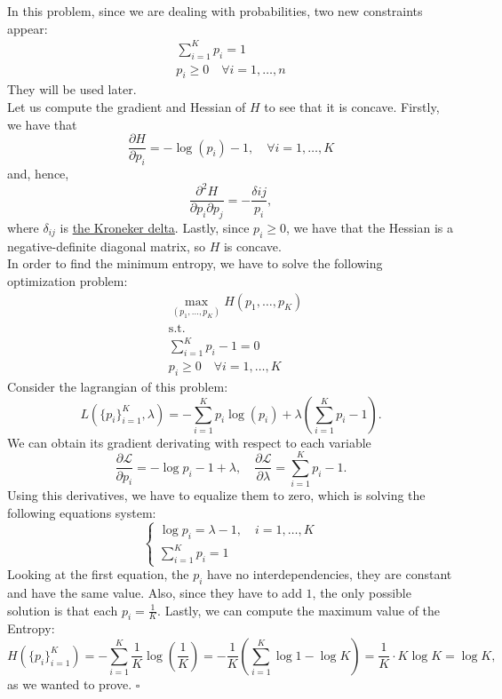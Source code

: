 \documentclass[11pt,table]{article}
\newcommand{\qed}{\hfill $\square$}
\begin{document}
In this problem, since we are dealing with probabilities, two new constraints appear:
\begin{align*}
	\sum_{i=1}^K p_i = 1 \\
	p_i \geq 0 \quad \forall i =1,\dots,n
\end{align*}
They will be used later.\\

Let us compute the gradient and Hessian of \(H\) to see that it is concave. Firstly, we have that
\[
	\frac{\partial H}{\partial p_i} = - \log(p_i) - 1, \quad \forall i = 1,\dots,K
\]
and, hence,
\[
	\frac{\partial^2 H}{\partial p_i \partial p_j} = - \frac{\delta{ij}}{p_i},
\]
where $\delta_{ij}$ is \href{https://en.wikipedia.org/wiki/Kronecker_delta}{the Kroneker delta}. Lastly, since \(p_i \geq 0\), we have that the Hessian is a negative-definite diagonal matrix, so \(H\) is concave.\\

In order to find the minimum entropy, we have to solve the following optimization problem:
\begin{align*}
	 & \max_{(p_1,\dots,p_K)} H(p_1,\dots,p_K) \\
	 & \text{s.t.}                             \\
	 & \sum_{i=1}^K p_i -1 = 0                 \\
	 & p_i \geq 0 \quad \forall i =1,\dots,K
\end{align*}
Consider the lagrangian of this problem:
\[
	L\left(\{p_i\}_{i=1}^K, \lambda\right) = - \sum_{i=1}^K p_i \log(p_i) + \lambda\left(\sum_{i=1}^K p_i -1\right).
\]
We can obtain its gradient derivating with respect to each variable
\[
	\frac{\partial \mathcal L}{\partial p_i} = - \log p_i - 1 + \lambda, \quad \frac{\partial \mathcal L}{\partial \lambda} =  \sum_{i=1}^K p_i -1.
\]
Using this derivatives, we have to equalize them to zero, which is solving the following equations system:
\[
	\begin{cases}
		\log p_i = \lambda - 1, \quad i = 1,\dots,K \\
		\sum_{i=1}^K p_i = 1
	\end{cases}
\]
Looking at the first equation, the \(p_i\) have no interdependencies, they are constant and have the same value. Also, since they have to add \(1\), the only possible solution is that each \(p_i = \frac{1}{K}\). Lastly, we can compute the maximum value of the Entropy:
\[
	H\left(\{p_i\}_{i=1}^K\right) = - \sum_{i=1}^K \frac{1}{K} \log \left(\frac{1}{K}\right)  = - \frac{1}{K} \left(\sum_{i=1}^K \log 1 - \log K\right) = \frac{1}{K} \cdot K \log K = \log K,
\]
as we wanted to prove. \qed
\end{document}
